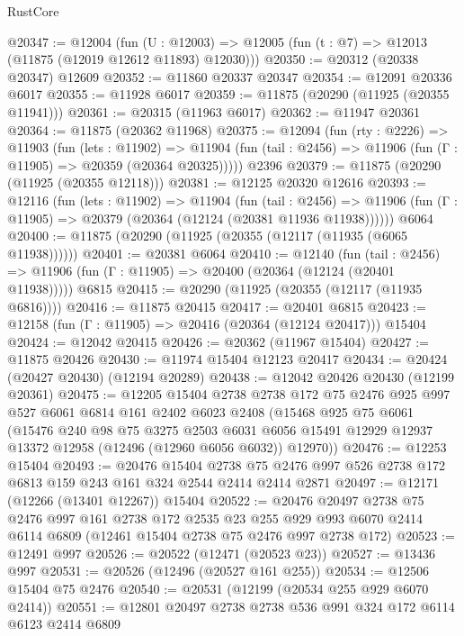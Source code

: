 \begin{lexlean}{RustCore}
\begin{coremodule}
@20347 := @12004
    (fun (U : @12003) => @12005 (fun (t : @7) => @12013 (@11875 (@12019 @12612 @11893) @12030)))
@20350 := @20312 (@20338 @20347) @12609
@20352 := @11860 @20337 @20347
@20354 := @12091 @20336 @6017
@20355 := @11928 @6017
@20359 := @11875 (@20290 (@11925 (@20355 @11941)))
@20361 := @20315 (@11963 @6017)
@20362 := @11947 @20361
@20364 := @11875 (@20362 @11968)
@20375 := @12094
    (fun (rty : @2226) =>
    @11903
      (fun (lets : @11902) =>
      @11904 (fun (tail : @2456) => @11906 (fun (Γ : @11905) => @20359 (@20364 @20325)))))
    @2396
@20379 := @11875 (@20290 (@11925 (@20355 @12118)))
@20381 := @12125 @20320 @12616
@20393 := @12116
    (fun (lets : @11902) =>
    @11904
      (fun (tail : @2456) =>
      @11906 (fun (Γ : @11905) => @20379 (@20364 (@12124 (@20381 @11936 @11938))))))
    @6064
@20400 := @11875 (@20290 (@11925 (@20355 (@12117 (@11935 (@6065 @11938))))))
@20401 := @20381 @6064
@20410 := @12140
    (fun (tail : @2456) => @11906 (fun (Γ : @11905) => @20400 (@20364 (@12124 (@20401 @11938)))))
    @6815
@20415 := @20290 (@11925 (@20355 (@12117 (@11935 @6816))))
@20416 := @11875 @20415
@20417 := @20401 @6815
@20423 := @12158 (fun (Γ : @11905) => @20416 (@20364 (@12124 @20417))) @15404
@20424 := @12042 @20415
@20426 := @20362 (@11967 @15404)
@20427 := @11875 @20426
@20430 := @11974 @15404 @12123 @20417
@20434 := @20424 (@20427 @20430) (@12194 @20289)
@20438 := @12042 @20426 @20430 (@12199 @20361)
@20475 := @12205
    @15404
    @2738
    @2738
    @172
    @75
    @2476
    @925
    @997
    @527
    @6061
    @6814
    @161
    @2402
    @6023
    @2408
    (@15468
      @925
      @75
      @6061
      (@15476
        @240
        @98
        @75
        @3275
        @2503
        @6031
        @6056
        @15491
        @12929
        @12937
        @13372
        @12958
        (@12496 (@12960 @6056 @6032))
        @12970))
@20476 := @12253 @15404
@20493 := @20476
    @15404
    @2738
    @75
    @2476
    @997
    @526
    @2738
    @172
    @6813
    @159
    @243
    @161
    @324
    @2544
    @2414
    @2414
    @2871
@20497 := @12171 (@12266 (@13401 @12267)) @15404
@20522 := @20476
    @20497
    @2738
    @75
    @2476
    @997
    @161
    @2738
    @172
    @2535
    @23
    @255
    @929
    @993
    @6070
    @2414
    @6114
    @6809
    (@12461 @15404 @2738 @75 @2476 @997 @2738 @172)
@20523 := @12491 @997
@20526 := @20522 (@12471 (@20523 @23))
@20527 := @13436 @997
@20531 := @20526 (@12496 (@20527 @161 @255))
@20534 := @12506 @15404 @75 @2476
@20540 := @20531 (@12199 (@20534 @255 @929 @6070 @2414))
@20551 := @12801 @20497 @2738 @2738 @536 @991 @324 @172 @6114 @6123 @2414 @6809

\end{coremodule}
\end{lexlean}
